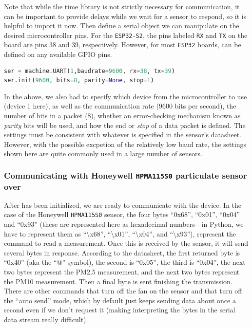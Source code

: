 Note that while the time library is not strictly necessary for \uart communication, it can be important to provide delays while we wait for a sensor to respond, so it is helpful to import it now.
Then define a serial object we can manipulate on the desired microcontroller pins. For the \texttt{ESP32-S2}, the pins labeled \texttt{RX} and \texttt{TX} on the board are pins 38 and 39, respectively.
However, for most \texttt{ESP32} boards, \uart can be defined on any available GPIO pins.
 
\begin{lstlisting}[language=Python]
ser = machine.UART(1,baudrate=9600, rx=38, tx=39)
ser.init(9600, bits=8, parity=None, stop=1)
\end{lstlisting}

In the above, we also had to specify which \uart device from the microcontroller to use (device 1 here), as well as the communication rate (9600 bits per second), the number of bits in a packet (8), whether an error-checking mechanism known as \emph{parity} bits will be used, and how the end or \emph{stop} of a data packet is defined.
The settings must be consistent with whatever is specified in the sensor's datasheet.
However, with the possible excpetion of the relatively low baud rate, the settings shown here are quite commonly used in a large number of sensors.

\subsubsection{Communicating with Honeywell \texttt{HPMA115S0} particulate sensor over \uart}

After \uart has been initialized, we are ready to communicate with the device.
In the case of the Honeywell \texttt{HPMA115S0} sensor, the four bytes “0x68”, “0x01”, “0x04” and “0x93” (these are represented here as hexadecimal numbers—in Python, we have to represent them as “\textbackslash x68”, “\textbackslash x01”, “\textbackslash x04”, and “\textbackslash x93”), represent the command to read a measurement.
Once this is received by the sensor, it will send several bytes in response.
According to the datasheet, the first returned byte  is “0x40” (aka the “@” symbol), the second is “0x05”, the third is “0x04”, the next two bytes represent the PM2.5 measurement, and the next two bytes represent the PM10 measurement.
Then a final byte is sent finishing the transmission.
There are other commands that turn off the fan on the sensor and that turn off the “auto send” mode, which by default just keeps sending data about once a second even if we don’t request it (making interpreting the bytes in the serial data stream really difficult).

